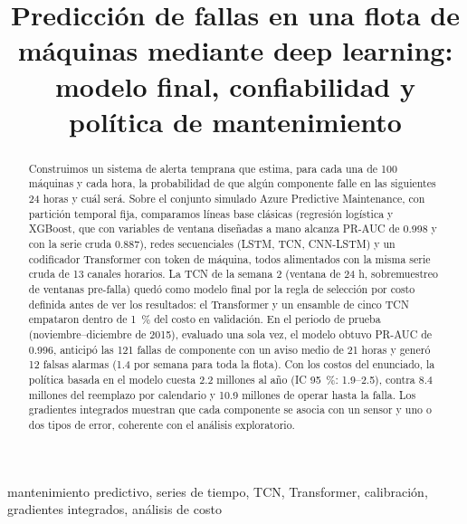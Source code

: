 \documentclass[conference,letterpaper]{IEEEtran}
\begin{document}
\title{Predicción de fallas en una flota de máquinas mediante deep learning: modelo final, confiabilidad y política de mantenimiento}

\author{
}

\maketitle

\begin{abstract}
Construimos un sistema de alerta temprana que estima, para cada una de 100 máquinas y cada hora, la probabilidad de que algún componente falle en las siguientes 24 horas y cuál será. Sobre el conjunto simulado Azure Predictive Maintenance, con partición temporal fija, comparamos líneas base clásicas (regresión logística y XGBoost, que con variables de ventana diseñadas a mano alcanza PR-AUC de 0.998 y con la serie cruda 0.887), redes secuenciales (LSTM, TCN, CNN-LSTM) y un codificador Transformer con token de máquina, todos alimentados con la misma serie cruda de 13 canales horarios. La TCN de la semana 2 (ventana de 24 h, sobremuestreo de ventanas pre-falla) quedó como modelo final por la regla de selección por costo definida antes de ver los resultados: el Transformer y un ensamble de cinco TCN empataron dentro de 1~\% del costo en validación. En el periodo de prueba (noviembre--diciembre de 2015), evaluado una sola vez, el modelo obtuvo PR-AUC de 0.996, anticipó las 121 fallas de componente con un aviso medio de 21 horas y generó 12 falsas alarmas (1.4 por semana para toda la flota). Con los costos del enunciado, la política basada en el modelo cuesta 2.2 millones al año (IC 95~\%: 1.9--2.5), contra 8.4 millones del reemplazo por calendario y 10.9 millones de operar hasta la falla. Los gradientes integrados muestran que cada componente se asocia con un sensor y uno o dos tipos de error, coherente con el análisis exploratorio.
\end{abstract}

\begin{IEEEkeywords}
mantenimiento predictivo, series de tiempo, TCN, Transformer, calibración, gradientes integrados, análisis de costo
\end{IEEEkeywords}
\end{document}
